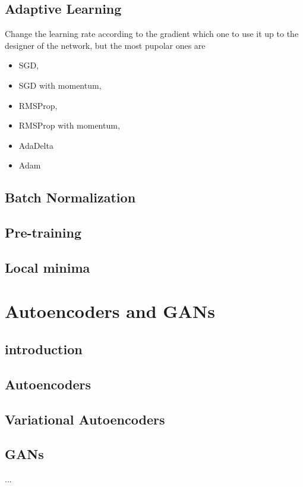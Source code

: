\documentclass[a4paper,10pt,titlepage]{report}
\begin{document}
\subsection{Adaptive Learning}
Change the learning rate according to the gradient which one to use it up to the designer of the network, but the most pupolar ones are 
\begin{itemize}
\item SGD, 
\item SGD with momentum, 
\item RMSProp, 
\item RMSProp with momentum,
\item AdaDelta
\item Adam
\end{itemize}
\subsection{Batch Normalization}

\subsection{Pre-training}
\subsection{Local minima}

\newpage
\section{Autoencoders and GANs}
\subsection{introduction}
\subsection{Autoencoders}
\subsection{Variational Autoencoders}
\subsection{GANs}
...
\end{document}

